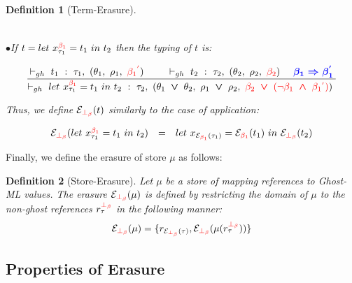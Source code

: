\documentclass[a4paper,11pt,oneside]{article}
\theoremstyle{plain}
\newtheorem{definition}{Definition}[subsection]
\newcommand{\rouge}[1]{\textcolor{red}{#1}}
\newcommand{\bwedge}{\boldsymbol{~\wedge~}}
\newcommand{\bvee}{\boldsymbol{~\vee~}}
\newcommand{\ghosttyping}[6]{\vdash_{gh}~#1~:~#2,~(#3,~#4,~\rouge{#5})~\textcolor{blue}{\boldsymbol{#6}}}
\newcommand{\gba}[1]{\beta_{#1}}
\newcommand{\gbb}{\bot_\beta}
\newcommand{\gbra}[1]{\textcolor{red}{\gba{#1}}}
\newcommand{\gbbr}{\textcolor{red}{\gbb}}
\newcommand{\gbran}[1]{\textcolor{red}{\neg\gba{#1}}}
\newcommand{\e}{\mathcal{E}}
\newcommand{\ebot}[1]{\e_{\gbbr}(#1)}
\newcommand{\egbra}[2]{\e_{\gbra{#1}}(#2)}
\begin{document}
\begin{definition}[Term-Erasure]
\begin{small}
\begin{adjustwidth}{-4cm}{3cm}
\begin{displaymath}
\begin{array}{llll}
\end{array}
\end{displaymath}
\end{adjustwidth}
\end{small}
\noindent$\bullet$\quad If $t = let~x^{\gbra{1}}_{\tau_1} = t_1~in~t_2$ then the typing of $t$ is:
\begin{footnotesize}
\begin{adjustwidth}{0cm}{0cm}
\begin{displaymath} 
\dfrac
	{
		\ghosttyping
			{t_1}
			{\tau_1}
			{\theta_1}
			{\rho_1}
			{\gbra{1}^{\rouge{'}}}
			{} \qquad
		\ghosttyping
			{t_2}
			{\tau_2}
			{\theta_2}
			{\rho_2}
			{\gbra{2}}
			{\quad \gba{1} \Rightarrow \gba{1}^{'}}
	}
	{\ghosttyping
		{let~x^{\gbra{1}}_{\tau_1} = t_1~in~t_2}
		{\tau_2}
		{\theta_1 \bvee \theta_2}
		{\rho_1 \bvee \rho_2}
		{\gbra{2} \bvee (\gbran{1} \bwedge \gbra{1}^{\rouge{'}})}
		{}}
\end{displaymath}
\end{adjustwidth}
\end{footnotesize}
Thus, we define $\ebot{t}$ similarly to the case of application:
\begin{small}
\begin{adjustwidth}{-3cm}{0cm}
\begin{displaymath} 
\begin{array}{llll}
\ebot{let~x^{\gbra{1}}_{\tau_1} = t_1~in~t_2} &=& 
let~x_{\egbra{1}{\tau_1}} = \egbra{1}{t_1}~in~\ebot{t_2} 
\end{array}
\end{displaymath}
\end{adjustwidth}
\end{small}
\end{definition}

Finally, we define the erasure of store $\mu$ as follows:
\begin{definition}[Store-Erasure]
Let $\mu$ be a store of mapping references to Ghost-ML values. 
The erasure $\ebot{\mu}$ is defined by restricting the domain of $\mu$ to the non-ghost references $r^{\gbbr}_{\tau}$ in the following manner:
$$ \ebot{\mu} = \lbrace r_{\ebot{\tau}}, \ebot{\mu(r^{\gbbr}_{\tau})} \rbrace $$
\label{sem-erasure}
\hypertarget{sem-erasure}{}
\end{definition}



\subsection{Properties of Erasure}
\end{document}
